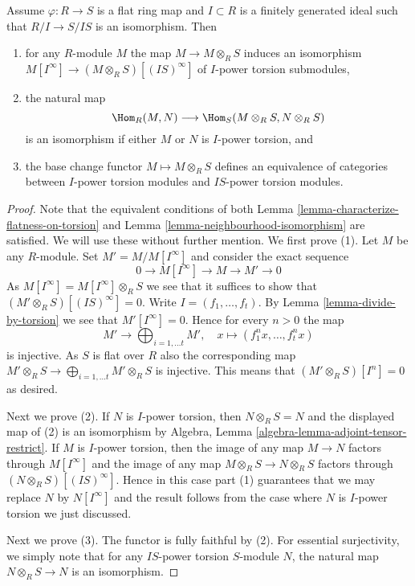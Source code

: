 \begin{lemma}
\label{lemma-neighbourhood-equivalence}
Assume $\varphi : R \to S$ is a flat ring map and $I \subset R$ is a
finitely generated ideal such that $R/I \to S/IS$ is an isomorphism. Then
\begin{enumerate}
\item for any $R$-module $M$ the map $M \to M \otimes_R S$ induces
an isomorphism
$M[I^\infty] \to (M \otimes_R S)[(IS)^\infty]$ of $I$-power
torsion submodules,
\item the natural map
$$
\Hom_R(M, N) \longrightarrow \Hom_S(M \otimes_R S, N \otimes_R S)
$$
is an isomorphism if either $M$ or $N$ is $I$-power torsion, and
\item the base change functor $M \mapsto M \otimes_R S$ defines an
equivalence of categories between $I$-power torsion modules
and $IS$-power torsion modules.
\end{enumerate}
\end{lemma}

\begin{proof}
Note that the equivalent conditions of both
Lemma \ref{lemma-characterize-flatness-on-torsion} and
Lemma \ref{lemma-neighbourhood-isomorphism}
are satisfied. We will use these without further mention.
We first prove (1). Let $M$ be any $R$-module.
Set $M' = M/M[I^\infty]$ and consider the exact sequence
$$
0 \to M[I^\infty] \to M \to M' \to 0
$$
As $M[I^\infty] = M[I^\infty] \otimes_R S$ we see that it suffices to
show that $(M' \otimes_R S)[(IS)^\infty] = 0$.
Write $I = (f_1, \ldots, f_t)$. By
Lemma \ref{lemma-divide-by-torsion}
we see that $M'[I^\infty] = 0$. Hence for every $n > 0$ the map
$$
M' \longrightarrow \bigoplus\nolimits_{i = 1, \ldots t} M',
\quad
x \longmapsto (f_1^n x, \ldots, f_t^n x)
$$
is injective. As $S$ is flat over $R$ also the corresponding map
$M' \otimes_R S \to \bigoplus_{i = 1, \ldots t} M' \otimes_R S$
is injective. This means that $(M' \otimes_R S)[I^n] = 0$ as desired.

\medskip\noindent
Next we prove (2). If $N$ is $I$-power torsion, then
$N \otimes_R S = N$ and the displayed map of (2) is an isomorphism by
Algebra, Lemma \ref{algebra-lemma-adjoint-tensor-restrict}.
If $M$ is $I$-power torsion, then the image of any map
$M \to N$ factors through $M[I^\infty]$ and the image of any map
$M \otimes_R S \to N \otimes_R S$ factors through
$(N \otimes_R S)[(IS)^\infty]$. Hence in this case
part (1) guarantees that we may replace $N$ by $N[I^\infty]$
and the result follows from the case where $N$ is $I$-power torsion
we just discussed.

\medskip\noindent
Next we prove (3). The functor is fully faithful by (2).
For essential surjectivity, we simply note that for any $IS$-power torsion
$S$-module $N$, the natural map $N \otimes_R S \to N$ is an isomorphism.
\end{proof}

